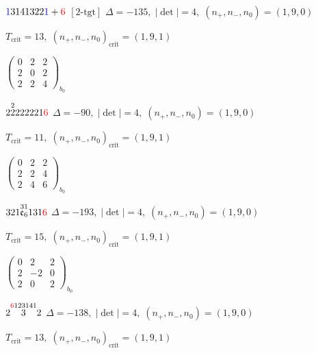 \documentclass[10pt]{article}
\begin{document}
$\textcolor{blue}{1}3141322\textcolor{blue}{1}+\textcolor{red}{6}$ $\scriptstyle [2\text{-tgt}]$ \quad $\Delta=-135,\; |\det|=4,\; (n_+,n_-,n_0)=(1,9,0)$

\hspace{1em}$T_{\text{crit}}=13,\; (n_+,n_-,n_0)_{\text{crit}}=(1,9,1)$

\hspace{2em}$\left(\begin{smallmatrix}0 & 2 & 2 \\ 2 & 0 & 2 \\ 2 & 2 & 4\end{smallmatrix}\right)_{\!b_0}$

\smallskip

$2\overset{2}{2}222221\textcolor{red}{6}$ \quad $\Delta=-90,\; |\det|=4,\; (n_+,n_-,n_0)=(1,9,0)$

\hspace{1em}$T_{\text{crit}}=11,\; (n_+,n_-,n_0)_{\text{crit}}=(1,9,1)$

\hspace{2em}$\left(\begin{smallmatrix}0 & 2 & 2 \\ 2 & 2 & 4 \\ 2 & 4 & 6\end{smallmatrix}\right)_{\!b_0}$

\smallskip

$321\overset{31}{\mathfrak{e}_6}131\textcolor{red}{6}$ \quad $\Delta=-193,\; |\det|=4,\; (n_+,n_-,n_0)=(1,9,0)$

\hspace{1em}$T_{\text{crit}}=15,\; (n_+,n_-,n_0)_{\text{crit}}=(1,9,1)$

\hspace{2em}$\left(\begin{smallmatrix}0 & 2 & 2 \\ 2 & -2 & 0 \\ 2 & 0 & 2\end{smallmatrix}\right)_{\!b_0}$

\smallskip

$2\overset{\textcolor{red}{6}123141}{3}2$ \quad $\Delta=-138,\; |\det|=4,\; (n_+,n_-,n_0)=(1,9,0)$

\hspace{1em}$T_{\text{crit}}=13,\; (n_+,n_-,n_0)_{\text{crit}}=(1,9,1)$
\end{document}
